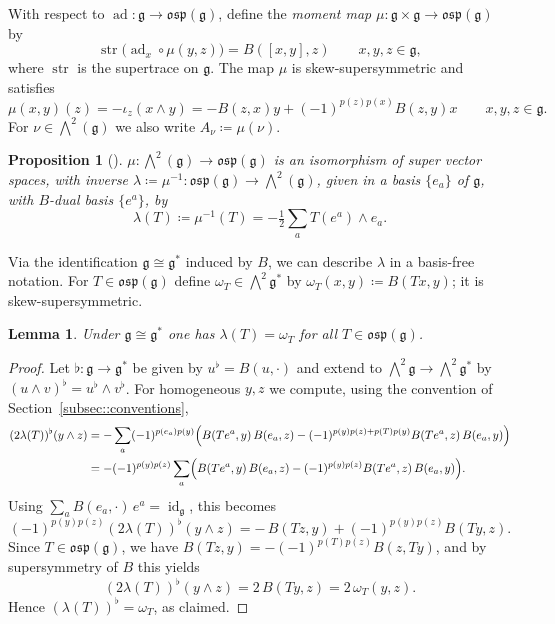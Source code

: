 \documentclass[11pt]{amsart}
\newcommand{\str}{\operatorname{str}}
\newcommand{\id}{\operatorname{id}}
\newcommand{\ad}{\operatorname{ad}}
\def\osp{{\mathfrak{osp}}}
\def\gg{{\mathfrak{g}}}
\theoremstyle{plain}
\newtheorem{lemma}[theorem]{Lemma}
\newtheorem{proposition}[theorem]{Proposition}
\theoremstyle{remark}
\theoremstyle{definition}
\numberwithin{equation}{section}
\theoremstyle{remark}
\begin{document}
With respect to $\ad:\gg\to\osp(\gg)$, define the \emph{moment map} $\mu:\gg\times\gg\to\osp(\gg)$ by
\begin{equation} \str\bigl(\ad_{x}\circ \mu(y,z)\bigr)=B([x,y],z)\qquad x,y,z\in\gg,
\end{equation}
where $\str$ is the supertrace on $\gg$. The map $\mu$ is skew-supersymmetric and satisfies
\begin{equation}
 \mu(x,y)(z)=-\iota_{z}(x\wedge y)
=-B(z,x)y+(-1)^{p(z)p(x)}B(z,y)x\qquad x,y,z\in\gg.
\end{equation}
For $\nu\in\bigwedge^{2}(\gg)$ we also write $A_{\nu}\coloneqq \mu(\nu)$.

\begin{proposition}[{\cite[Prop.~2.13]{Meyer}}]
 $\mu:\bigwedge^{2}(\gg)\to\osp(\gg)$ is an isomorphism of super vector spaces, with inverse $\lambda\coloneqq \mu^{-1}:\osp(\gg)\to\bigwedge^{2}(\gg)$, given in a basis $\{e_{a}\}$ of $\gg$, with $B$-dual basis $\{e^{a}\}$, by
\begin{equation*}
 \lambda(T)\coloneqq \mu^{-1}(T)=-\tfrac{1}{2}\sum_{a}T(e^{a})\wedge e_{a}.
\end{equation*}
\end{proposition}

Via the identification $\gg\cong \gg^{\ast}$ induced by $B$, we can describe $\lambda$ in a basis-free notation. For $T\in\osp(\gg)$ define
$\omega_{T}\in\bigwedge^{2}\gg^{*}$ by $\omega_{T}(x,y)\coloneqq B(Tx,y)$; it is skew-supersymmetric.

\begin{lemma}\label{lemm::identification_lambda_omega}
Under $\gg\cong \gg^{\ast}$ one has $\lambda(T)=\omega_{T}$ for all $T\in\osp(\gg)$.
\end{lemma}

\begin{proof}
Let $\flat:\gg\to\gg^{*}$ be given by $u^{\flat}=B(u,\cdot)$ and extend to
$\bigwedge^{2}\gg\to\bigwedge^{2}\gg^{*}$ by $(u\wedge v)^{\flat}=u^{\flat}\wedge v^{\flat}$.
For homogeneous $y,z$ we compute, using the convention of Section~\ref{subsec::conventions},
\[
\begin{split}
(2\lambda(T))^{\flat}(y\wedge z)
&=-\sum_{a}(-1)^{p(e_a)p(y)}\Bigl(B(Te^{a},y)\,B(e_a,z)
-(-1)^{p(y)p(z)+p(T)p(y)}B(Te^{a},z)\,B(e_a,y)\Bigr)\\
&=-(-1)^{p(y)p(z)}\sum_{a}\Bigl(B(Te^{a},y)\,B(e_a,z)-(-1)^{p(y)p(z)}B(Te^{a},z)\,B(e_a,y)\Bigr).
\end{split}
\]
Using $\sum_{a}B(e_a,\cdot)\,e^{a}=\id_{\gg}$, this becomes
\[
(-1)^{p(y)p(z)}(2\lambda(T))^{\flat}(y\wedge z)
=-\,B(Tz,y)+(-1)^{p(y)p(z)}B(Ty,z).
\]
Since $T\in\osp(\gg)$, we have $B(Tz,y)=-(-1)^{p(T)p(z)}B(z,Ty)$, and by supersymmetry of $B$ this yields
\[
(2\lambda(T))^{\flat}(y\wedge z)=2\,B(Ty,z)=2\,\omega_{T}(y,z).
\]
Hence $(\lambda(T))^{\flat}=\omega_{T}$, as claimed. \qedhere
\end{proof}
\end{document}
